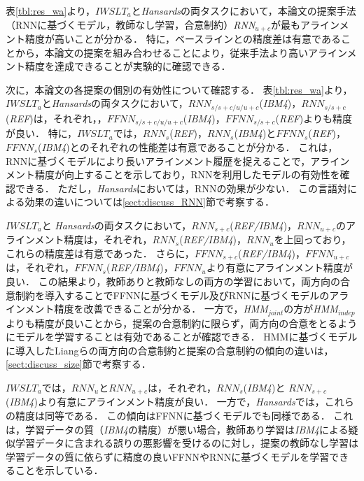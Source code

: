\documentclass[japanese]{jnlp_1.4}
\begin{document}
表\ref{tbl:res_wa}より，$\mathit{IWSLT}_{a}$と{\it Hansards}の両タスクにおいて，本論文の提案手法（RNNに基づくモデル，教師なし学習，合意制約）{\it RNN$_{u+c}$}が最もアラインメント精度が高いことが分かる．
特に，ベースラインとの精度差は有意であることから，本論文の提案を組み合わせることにより，従来手法より高いアラインメント精度を達成できることが実験的に確認できる．

次に，本論文の各提案の個別の有効性について確認する．
表\ref{tbl:res_wa}より，$\mathit{IWSLT}_{a}$と{\it Hansards}の両タスクにおいて，$\mathit{RNN}_{s/s+c/u/u+c}$({\it IBM4})，$\mathit{RNN}_{s/s+c}$({\it REF})は，それぞれ，，$\mathit{FFNN}_{s/s+c/u/u+c}$({\it IBM4})，$\mathit{FFNN}_{s/s+c}$({\it REF})よりも精度が良い．
特に，$\mathit{IWSLT}_{a}$では，$\mathit{RNN}_{s}$({\it REF})，$\mathit{RNN}_{s}$({\it IBM4})と$\mathit{FFNN}_{s}$({\it REF})，$\mathit{FFNN}_{s}$({\it IBM4})とのそれぞれの性能差は有意であることが分かる．
これは，RNNに基づくモデルにより長いアラインメント履歴を捉えることで，アラインメント精度が向上することを示しており，RNNを利用したモデルの有効性を確認できる．
ただし，{\it Hansards}においては，RNNの効果が少ない．
この言語対による効果の違いについては\ref{sect:discuss_RNN}節で考察する．

$\mathit{IWSLT}_{a}$と \textit{Hansards}の両タスクにおいて，$\mathit{RNN}_{s+c}$({\it REF/IBM4})，$\mathit{RNN}_{u+c}$のアラインメント精度は，それぞれ，$\mathit{RNN}_{s}$({\it REF/IBM4})，$\mathit{RNN}_{u}$を上回っており，これらの精度差は有意であった．
さらに，$\mathit{FFNN}_{s+c}$({\it REF/IBM4})，$\mathit{FFNN}_{u+c}$は，それぞれ，$\mathit{FFNN}_{s}$({\it REF/IBM4})，$\mathit{FFNN}_{u}$より有意にアラインメント精度が良い．
この結果より，教師ありと教師なしの両方の学習において，両方向の合意制約を導入することでFFNNに基づくモデル及びRNNに基づくモデルのアラインメント精度を改善できることが分かる．
一方で，{\it HMM$_{joint}$}の方が{\it HMM$_{indep}$}よりも精度が良いことから，提案の合意制約に限らず，両方向の合意をとるようにモデルを学習することは有効であることが確認できる．
HMMに基づくモデルに導入したLiangらの両方向の合意制約と提案の合意制約の傾向の違いは，\ref{sect:discuss_size}節で考察する．

$\mathit{IWSLT}_{a}$では，$\mathit{RNN}_{u}$と$\mathit{RNN}_{u+c}$は，それぞれ，$\mathit{RNN}_{s}$({\it IBM4})と $\mathit{RNN}_{s+c}$({\it IBM4})より有意にアラインメント精度が良い．
一方で，{\it Hansards}では，これらの精度は同等である．
この傾向はFFNNに基づくモデルでも同様である．
これは，学習データの質（{\it IBM4}の精度）が悪い場合，教師あり学習は{\it IBM4}による疑似学習データに含まれる誤りの悪影響を受けるのに対し，提案の教師なし学習は学習データの質に依らずに精度の良いFFNNやRNNに基づくモデルを学習できることを示している．
\end{document}
